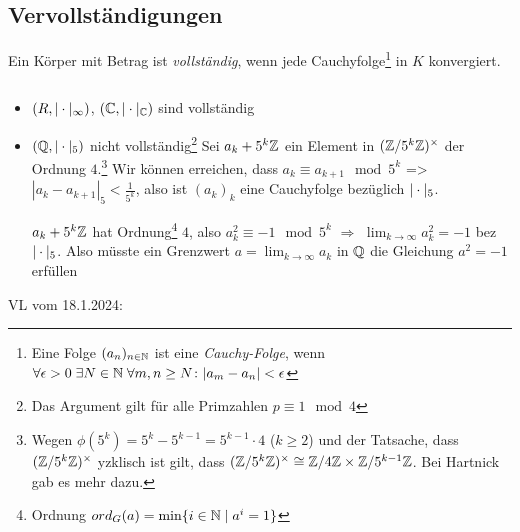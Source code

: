 \documentclass[../main.tex]{subfiles}
\begin{document}
\subsection{Vervollständigungen}
\begin{definition}
    Ein Körper mit Betrag ist \emph{vollständig}, wenn jede Cauchyfolge\footnote{Eine Folge $(a_n)_{n\in\mathbb{N}}$ ist eine \emph{Cauchy-Folge}, wenn $\forall\epsilon>0\;\exists N\in \mathbb{N}\;\forall m,n\geq N\colon |a_m - a_n| <\epsilon$} in $K$ konvergiert.
\end{definition}
\begin{example} $ $
    \begin{itemize}
        \item $(R,|\cdot|_\infty)$, $(\mathbb{C}, |\cdot|_{\mathbb{C}})$ sind vollständig
        \item $(\mathbb{Q}, |\cdot|_5)$ nicht vollständig\footnote{Das Argument gilt für alle Primzahlen $p\equiv 1\mod 4$}
        Sei $a_k + 5^k\mathbb{Z}$ ein Element in $(\mathbb{Z}/5^k\mathbb{Z})^\times$ der Ordnung $4$.\footnote{Wegen $\phi(5^k) = 5^k-5^{k-1}  = 5^{k-1} \cdot 4$ ($k\geq 2$) und der Tatsache, dass $(\mathbb{Z}/5^k\mathbb{Z})^\times$ yzklisch ist gilt, dass $(\mathbb{Z}/5^k\mathbb{Z})^\times \cong \mathbb{Z}/4\mathbb{Z} \times \mathbb{Z}/5^{k-1}\mathbb{Z}$. Bei Hartnick gab es mehr dazu.}
        Wir können erreichen, dass $a_k\equiv a_{k+1}\mod 5^k$
        => $|a_k-a_{k+1}|_5 < \frac{1}{5^k}$, also ist $(a_k)_k$ eine Cauchyfolge bezüglich $|\cdot|_5$.

        $a_k + 5^k\mathbb{Z}$ hat Ordnung\footnote{Ordnung $ord_G(a) = \min\{i\in\mathbb{N}\mid a^i = 1\}$} $4$, also $a_k^2 \equiv -1 \mod 5^k$ $\Longrightarrow$ $\lim_{k\rightarrow \infty} a_k^2 = -1$ bez $|\cdot|_5$.
        Also müsste ein Grenzwert $a=\lim_{k\rightarrow \infty} a_k$ in $\mathbb{Q}$ die Gleichung $a^2= -1$ erfüllen \Lightning
    \end{itemize}
\end{example}

\begin{flushright}
VL vom 18.1.2024:
\end{flushright}
\end{document}
